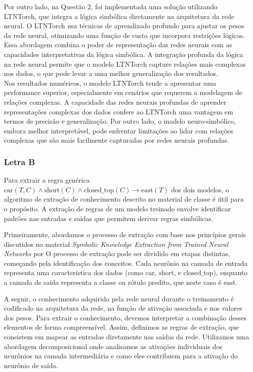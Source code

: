 \documentclass[12pt]{article}
\begin{document}
Por outro lado, na Questão 2, foi implementada uma solução utilizando LTNTorch, que integra a lógica simbólica diretamente na arquitetura da rede neural. O LTNTorch usa técnicas de aprendizado profundo para ajustar os pesos da rede neural, otimizando uma função de custo que incorpora restrições lógicas. Essa abordagem combina o poder de representação das redes neurais com as capacidades interpretativas da lógica simbólica. A integração profunda da lógica na rede neural permite que o modelo LTNTorch capture relações mais complexas nos dados, o que pode levar a uma melhor generalização dos resultados.\\
Nos resultados numéricos, o modelo LTNTorch tende a apresentar uma performance superior, especialmente em cenários que requerem a modelagem de relações complexas. A capacidade das redes neurais profundas de aprender representações complexas dos dados confere ao LTNTorch uma vantagem em termos de precisão e generalização. Por outro lado, o modelo neuro-simbólico, embora melhor interpretável, pode enfrentar limitações ao lidar com relações complexas que são mais facilmente capturadas por redes neurais profundas.

\subsubsection{Letra B}

Para extrair a regra genérica $\text{car}(T,C) \land \text{short}(C) \land \text{closed\_top}(C) \rightarrow \text{east}(T)$ dos dois modelos, o algoritmo de extração de conhecimento descrito no material de classe é útil para o propósito. A extração de regras de um modelo treinado envolve identificar padrões nas entradas e saídas que permitem derivar regras simbólicas.

Primeiramente, abordamos o processo de extração com base nos princípios gerais discutidos no material \textit{Symbolic Knowledge Extraction from Trained Neural Networks} por \cite{DAVILAGARCEZ2001155} O processo de extração pode ser dividido em etapas distintas, começando pela identificação dos conceitos. Cada neurônio na camada de entrada representa uma característica dos dados (como $\text{car}$, $\text{short}$, e $\text{closed\_top}$), enquanto a camada de saída representa a classe ou rótulo predito, que neste caso é $\text{east}$.

A seguir, o conhecimento adquirido pela rede neural durante o treinamento é codificado na arquitetura da rede, na função de ativação associada e nos valores dos pesos. Para extrair o conhecimento, devemos interpretar a combinação desses elementos de forma compreensível. Assim, definimos as regras de extração, que consistem em mapear as entradas diretamente nas saídas da rede. Utilizamos uma abordagem decomposicional onde analisamos as ativações individuais dos neurônios na camada intermediária e como eles contribuem para a ativação do neurônio de saída.
\end{document}
